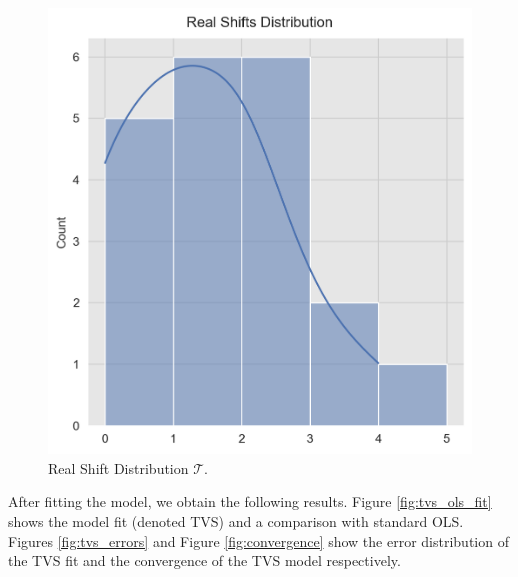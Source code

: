 \documentclass[11pt]{amsart}
\theoremstyle{definition}
\theoremstyle{definition}
\begin{document}
\begin{center}
\begin{figure}
\includegraphics[scale=0.5]{images/real_shifts.png}
\caption{Real Shift Distribution $\mathcal{T}$.}
\label{fig:real_shifts}
\end{figure}
\end{center}

After fitting the model, we obtain the following results. Figure \ref{fig:tvs_ols_fit} shows the model fit (denoted TVS) and a comparison with standard OLS. Figures \ref{fig:tvs_errors} and Figure \ref{fig:convergence} show the error distribution of the TVS fit and the convergence of the TVS model respectively.
\end{document}
